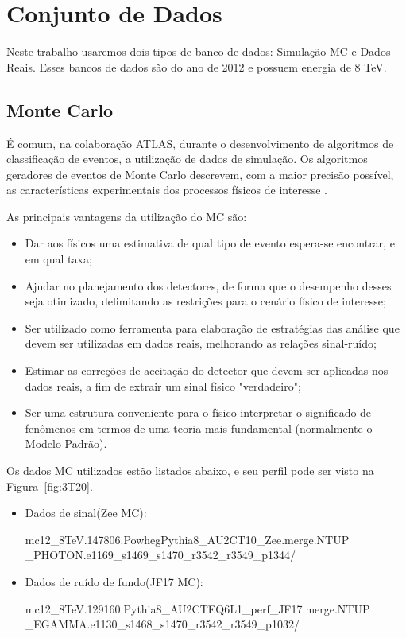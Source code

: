 \section{Conjunto de Dados}

Neste trabalho usaremos dois tipos de banco de dados: Simulação \ac{MC} e Dados Reais.	Esses bancos de dados são do ano de 2012 e possuem energia de 8 TeV. 	

\subsection{Monte Carlo}\label{sec:mc_data}
É comum, na colaboração ATLAS, durante o desenvolvimento de algoritmos de classificação de eventos, a utilização de dados de simulação. Os algoritmos geradores de eventos de Monte Carlo descrevem, com a maior precisão possível, as características experimentais dos processos físicos de interesse \cite{sjostrand1991monte}.
	
As principais vantagens da utilização do MC são:

\begin{itemize}
\item Dar aos físicos uma estimativa de qual tipo de evento espera-se encontrar, e em qual taxa;
\item Ajudar no planejamento dos detectores, de forma que o desempenho desses seja otimizado, delimitando as restrições para o cenário físico de interesse;
\item Ser utilizado como ferramenta para elaboração de estratégias das análise que devem ser utilizadas em dados reais, melhorando as relações sinal-ruído;
\item Estimar as correções de aceitação do detector que devem ser aplicadas nos dados reais, a fim de extrair um sinal físico "verdadeiro";
\item Ser uma estrutura conveniente para o físico interpretar o significado de fenômenos em termos de uma teoria mais fundamental (normalmente o Modelo Padrão).
\end{itemize}

	Os dados MC utilizados estão listados abaixo, e seu perfil pode ser visto na Figura~\ref{fig:3T20}.

\begin{itemize}
\item Dados de sinal(Zee MC):

    mc12\_8TeV.147806.PowhegPythia8\_AU2CT10\_Zee.merge.NTUP\\ \_PHOTON.e1169\_s1469\_s1470\_r3542\_r3549\_p1344/
\item Dados de ruído de fundo(JF17 MC):

    mc12\_8TeV.129160.Pythia8\_AU2CTEQ6L1\_perf\_JF17.merge.NTUP\\ \_EGAMMA.e1130\_s1468\_s1470\_r3542\_r3549\_p1032/
\end{itemize}


